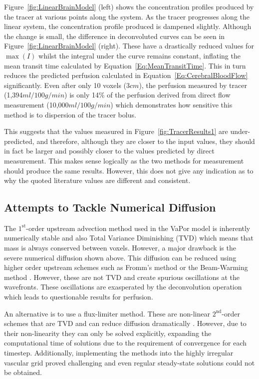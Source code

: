 \documentclass[11pt,english,a4paper,twoside,openright]{report}
\begin{document}
{{{{{{{Figure~\ref{fig:LinearBrainModel} (left) shows the concentration profiles produced by the tracer at various points along the system. As the tracer progresses along the linear system, the concentration profile produced is dampened slightly. Although the change is small, the difference in deconvoluted curves can be seen in Figure~\ref{fig:LinearBrainModel} (right). These have a drastically reduced values for $\max(I)$ whilst the integral under the curve remains constant, inflating the mean transit time calculated by Equation~\ref{Eq:MeanTransitTime}. This in turn reduces the predicted perfusion calculated in Equation~\ref{Eq:CerebralBloodFlow} significantly. Even after only 10 voxels ($3cm$), the perfusion measured by tracer (1,394$ml/100g/min$) is only 14\% of the perfusion derived from direct flow measurement (10,000$ml/100g/min$) which demonstrates how sensitive this method is to dispersion of the tracer bolus.

This suggests that the values measured in Figure~\ref{fig:TracerResults1} are under-predicted, and therefore, although they are closer to the input values, they should in fact be larger and possibly closer to the values predicted by direct measurement. This makes sense logically as the two methods for measurement should produce the same results. However, this does not give any indication as to why the quoted literature values are different and consistent.	

\subsection{Attempts to Tackle Numerical Diffusion}

The $1^{\text{st}}$-order upstream advection method used in the VaPor model is inherently numerically stable and also Total Variance Diminishing (TVD) which means that mass is always conserved between voxels. However, a major drawback is the severe numerical diffusion shown above. This diffusion can be reduced using higher order upstream schemes such as Fromm's method \cite{fromm1968method} or the Beam-Warming method \cite{beam1976implicit}. However, these are not TVD and create spurious oscillations at the wavefronts. These oscillations are exasperated by the deconvolution operation which leads to questionable results for perfusion.

An alternative is to use a flux-limiter method. These are non-linear $2^{\text{nd}}$-order schemes that are TVD and can reduce diffusion dramatically \cite{roe1986characteristic}. However, due to their non-linearity they can only be solved explicitly, expanding the computational time of solutions due to the requirement of convergence for each timestep. Additionally, implementing the methods into the highly irregular vascular grid proved challenging and even regular steady-state solutions could not be obtained.

}}}}}}}
\end{document}
